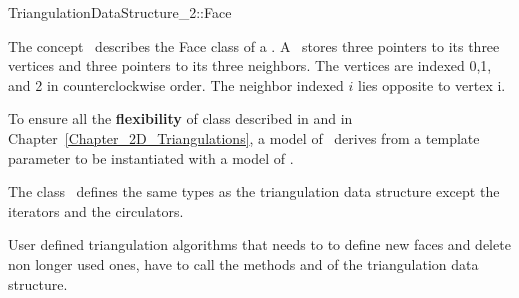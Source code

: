

\begin{ccRefConcept}{TriangulationDataStructure_2::Face}


\ccDefinition
  
The concept \ccRefName\  describes the Face class of a 
.
A \ccRefName\ stores three pointers to its three vertices
and three pointers to its three neighbors.
The vertices are indexed 0,1, and 2 in counterclockwise order.
The  neighbor indexed $i$ lies
opposite to vertex i.

To ensure all the \textbf{flexibility} of class 
described in 
and in Chapter~\ref{Chapter_2D_Triangulations}, a model of 
\ccRefName\ derives from a template parameter
 to be instantiated with a model of 
.

\ccTypes
The class \ccRefName\ defines the same types as 
the triangulation data structure 
except the iterators and the circulators.

\begin{ccAdvanced}
\ccCreation

User defined triangulation algorithms  that needs to
to define new faces and delete non longer used ones,
have to call the methods  and
 of the triangulation data structure.




\end{ccAdvanced}
\end{ccRefConcept}
